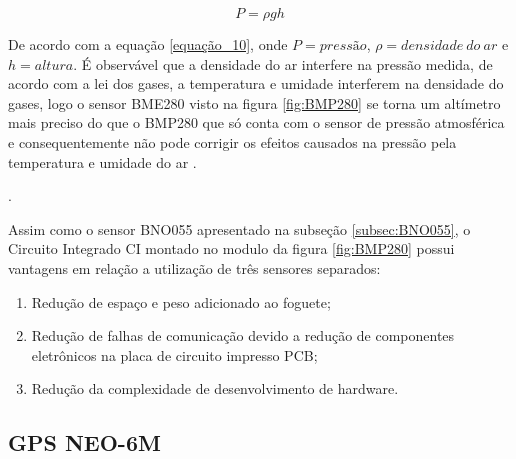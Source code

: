 \begin{equation}
    P = \rho gh
     \label{equação_10}
\end{equation}


De acordo com a equação \ref{equação_10}, onde $P = pressão$, $\rho =  densidade \ do \ ar$ e $h = altura $. É observável que a densidade do ar interfere na pressão medida, de acordo com a lei dos gases, a temperatura e umidade interferem na densidade do gases, logo o sensor BME280 visto na figura \ref{fig:BMP280} se torna um altímetro mais preciso do que o BMP280  que só conta com o sensor de pressão atmosférica e consequentemente não pode corrigir os efeitos causados na pressão pela temperatura e umidade do ar  \cite[p.~465]{Halliday2010}.




 .

Assim como o sensor BNO055 apresentado na subseção \ref{subsec:BNO055},  o  Circuito Integrado CI montado no modulo da figura \ref{fig:BMP280} possui vantagens em relação a utilização de três sensores separados:


 \begin{enumerate}
   \item Redução de espaço e peso adicionado ao foguete;
   \item Redução de falhas de comunicação devido a redução de componentes eletrônicos na placa de circuito impresso PCB;
   \item Redução da complexidade de desenvolvimento de hardware.
 \end{enumerate}






\newpage
\subsection{GPS NEO-6M}

